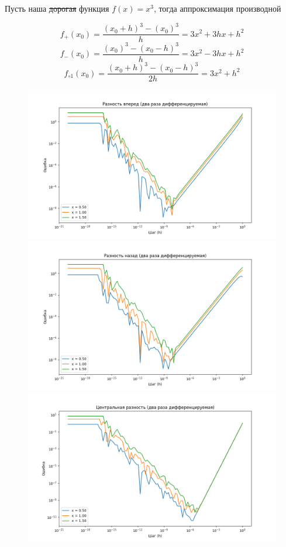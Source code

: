 \documentclass{report}
\begin{document}
Пусть наша \sout{дорогая} функция $f(x)=x^3$, тогда аппроксимация производной


\begin{equation}
  f_+(x_0)=\dfrac{(x_0+h)^3-(x_0)^3}{h}=3x^2+3hx+h^2
\end{equation}
\begin{equation}
f_-(x_0)=\dfrac{(x_0)^3-(x_0-h)^3}{h}=3x^2-3hx+h^2
\end{equation}
\begin{equation}
  f_{\circ 1}(x_0)=\dfrac{(x_0+h)^3-(x_0-h)^3}{2h}=3x^2+h^2
\end{equation}

\begin{figure}[H]
  \centering
  \includegraphics[scale=0.5]{fig_1.png}
  \includegraphics[scale=0.5]{fig_2.png}
  \includegraphics[scale=0.5]{fig_3.png}
\end{figure}
\end{document}
